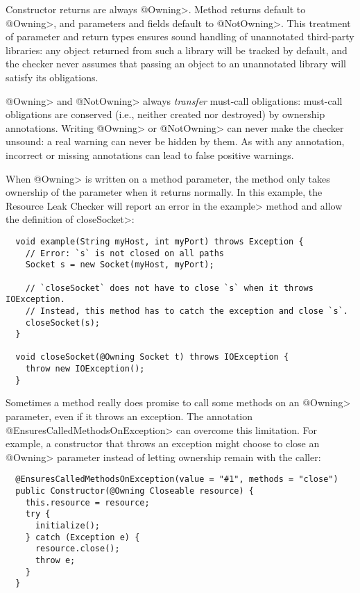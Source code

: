 Constructor returns are always \<@Owning>.
Method returns default to \<@Owning>,
and parameters and fields default to \<@NotOwning>. This treatment of parameter and
return types ensures sound handling of unannotated third-party libraries: any
object returned from such a library will be tracked by default, and the checker
never assumes that passing an object to an unannotated library will satisfy its obligations.

\<@Owning> and \<@NotOwning> always \emph{transfer} must-call obligations: must-call
obligations are conserved (i.e., neither created nor destroyed) by ownership annotations.
Writing \<@Owning> or \<@NotOwning> can never make the checker
unsound:  a real warning can never be hidden by them.
As with any annotation, incorrect or missing annotations can lead to false positive warnings.


When \<@Owning> is written on a method parameter, the method only takes ownership of the
parameter when it returns normally.  In this example, the Resource Leak Checker will report
an error in the \<example> method and allow the definition of \<closeSocket>:

\begin{verbatim}
  void example(String myHost, int myPort) throws Exception {
    // Error: `s` is not closed on all paths
    Socket s = new Socket(myHost, myPort);

    // `closeSocket` does not have to close `s` when it throws IOException.
    // Instead, this method has to catch the exception and close `s`.
    closeSocket(s);
  }

  void closeSocket(@Owning Socket t) throws IOException {
    throw new IOException();
  }
\end{verbatim}

Sometimes a method really does promise to call some methods on an \<@Owning> parameter,
even if it throws an exception.  The annotation \<@EnsuresCalledMethodsOnException> can
overcome this limitation.  For example, a constructor that throws an exception might
choose to close an \<@Owning> parameter instead of letting ownership remain with the caller:

\begin{verbatim}
  @EnsuresCalledMethodsOnException(value = "#1", methods = "close")
  public Constructor(@Owning Closeable resource) {
    this.resource = resource;
    try {
      initialize();
    } catch (Exception e) {
      resource.close();
      throw e;
    }
  }
\end{verbatim}

